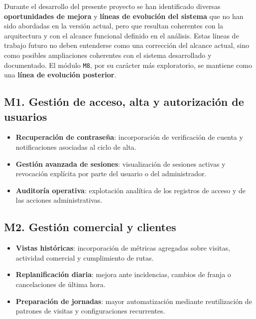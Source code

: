 Durante el desarrollo del presente proyecto se han identificado diversas \textbf{oportunidades de mejora} y \textbf{líneas de evolución del sistema} que no han sido abordadas en la versión actual, pero que resultan coherentes con la arquitectura y con el alcance funcional definido en el análisis. Estas líneas de trabajo futuro no deben entenderse como una corrección del alcance actual, sino como posibles ampliaciones coherentes con el sistema desarrollado y documentado. El módulo \texttt{M8}, por su carácter más exploratorio, se mantiene como una \textbf{línea de evolución posterior}.

\subsection*{M1. Gestión de acceso, alta y autorización de usuarios}
\begin{itemize}
    \item \textbf{Recuperación de contraseña}: incorporación de verificación de cuenta y notificaciones asociadas al ciclo de alta.
    \item \textbf{Gestión avanzada de sesiones}: visualización de sesiones activas y revocación explícita por parte del usuario o del administrador.
    \item \textbf{Auditoría operativa}: explotación analítica de los registros de acceso y de las acciones administrativas.
\end{itemize}

\subsection*{M2. Gestión comercial y clientes}
\begin{itemize}
    \item \textbf{Vistas históricas}: incorporación de métricas agregadas sobre visitas, actividad comercial y cumplimiento de rutas.
    \item \textbf{Replanificación diaria}: mejora ante incidencias, cambios de franja o cancelaciones de última hora.
    \item \textbf{Preparación de jornadas}: mayor automatización mediante reutilización de patrones de visitas y configuraciones recurrentes.
\end{itemize}

